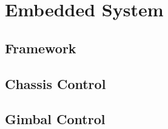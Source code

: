 \section{Embedded System} 
\subsection{Framework}

\subsection{Chassis Control}
\subsection{Gimbal Control}

\pagebreak